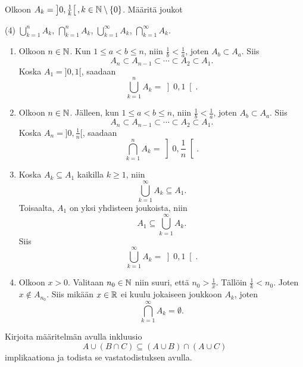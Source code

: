 \documentclass[12pt,a4paper]{article}
\begin{document}
\begin{exercise}
Olkoon \(A_k = \left]0, \frac{1}{k}\right[, k \in \mathbb{N} \setminus \left\lbrace0\right\rbrace\).
Määritä joukot
\begin{tasks}(4)
\task \(\displaystyle \bigcup_{k=1}^n A_k\),
\task \(\displaystyle \bigcap_{k=1}^n A_k\),
\task \(\displaystyle \bigcup_{k=1}^{\infty} A_k\),
\task \(\displaystyle \bigcap_{k=1}^{\infty} A_k\).
\end{tasks}
\end{exercise}

\begin{solution}
\leavevmode\par
\begin{enumerate}[label=\alph*), nosep]
\item Olkoon \(n \in \mathbb{N}\). Kun \(1 \leq a < b \leq n\),
niin \(\frac{1}{b} < \frac{1}{a}\), joten \(A_b \subset A_a\). Siis
\[
A_n \subset A_{n - 1} \subset \cdots \subset A_2 \subset A_1.
\]
Koska \(A_1 = ]0, 1[\), saadaan
\[
\bigcup_{k=1}^n A_k = \left]0, 1\right[.
\]

\item Olkoon \(n \in \mathbb{N}\). Jälleen, kun \(1 \leq a < b \leq n\),
niin \(\frac{1}{b} < \frac{1}{a}\), joten \(A_b \subset A_a\). Siis
\[
A_n \subset A_{n - 1} \subset \cdots \subset A_2 \subset A_1.
\]
Koska \(A_n = ]0, \frac{1}{n}[\), saadaan
\[
\bigcap_{k=1}^n A_k = \left]0, \frac{1}{n}\right[.
\]

\item Koska \(A_k \subseteq A_1\) kaikilla \(k \geq 1\), niin
\[
\bigcup_{k=1}^{\infty} A_k \subseteq A_1.
\]
Toisaalta, \(A_1\) on yksi yhdisteen joukoista, niin
\[
A_1 \subseteq \bigcup_{k=1}^{\infty} A_k.
\]
Siis
\[
\bigcup_{k=1}^{\infty} A_k = \left]0, 1\right[.
\]

\item Olkoon \(x > 0\). Valitaan \(n_0 \in \mathbb{N}\) niin suuri, että
\(n_0 > \frac{1}{x}\). Tällöin \(\frac{1}{k} < n_0\). Joten
\(x \notin A_{n_0}\). Siis mikään \(x \in \mathbb{R}\) ei kuulu jokaiseen
joukkoon \(A_k\), joten
\[
\bigcap_{k = 1}^{\infty} A_k = \emptyset.
\]
\end{enumerate}
\end{solution}

\begin{exercise}
Kirjoita määritelmän avulla inkluusio
\[
A \cup (B \cap C) \subseteq (A \cup B) \cap (A \cup C)
\]
implikaationa ja todista se vastatodistuksen avulla.
\end{exercise}
\end{document}
